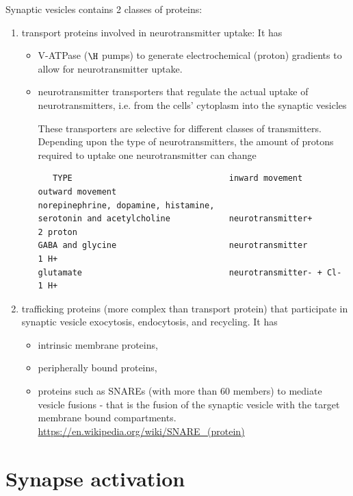 Synaptic vesicles contains 2 classes of proteins:
\begin{enumerate}
  \item  transport proteins involved in neurotransmitter uptake:
  It has 

\begin{itemize}
  \item   V-ATPase ($\H$ pumps) to generate electrochemical (proton) gradients
  to allow for neurotransmitter uptake.
  
  \item neurotransmitter transporters that regulate the actual uptake of
  neurotransmitters, i.e.  from the cells' cytoplasm into the synaptic vesicles
  
  These transporters are selective for different classes of transmitters.
  Depending upon the type of neurotransmitters, the amount of protons required
  to uptake one neurotransmitter can change
  \begin{verbatim}
   TYPE                                inward movement          outward movement
norepinephrine, dopamine, histamine, 
serotonin and acetylcholine	           neurotransmitter+	      2 proton
GABA and glycine	                   neurotransmitter	          1 H+
glutamate	                           neurotransmitter- + Cl-	  1 H+  
  \end{verbatim}
\end{itemize}  
  
  \item trafficking proteins (more complex than transport protein) that
  participate in synaptic vesicle exocytosis, endocytosis, and recycling. It has
  \begin{itemize}
    \item intrinsic membrane proteins, 
    
    \item peripherally bound proteins, 
    
    \item proteins such as SNAREs (with more than 60 members) to mediate vesicle
    fusions - that is the fusion of the synaptic vesicle with the target
    membrane bound compartments.
    \url{https://en.wikipedia.org/wiki/SNARE_(protein)}
  \end{itemize}
  
\end{enumerate}

\section{Synapse activation}
\label{sec:synapse-activation}

